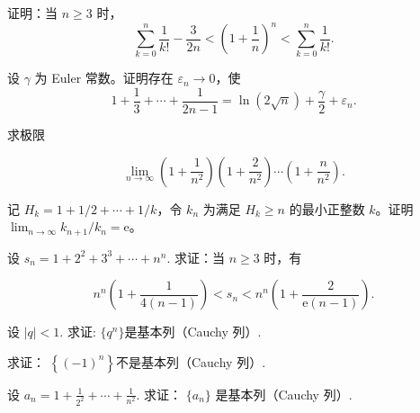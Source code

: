 \newpage
\noindent\begin{minipage}{\textwidth}
证明：当 $n\ge3$ 时，\[\sum_{k=0}^n\frac1{k!}-\frac3{2n}<\left(1+\frac1n\right)^n<\sum_{k=0}^n\frac1{k!}.\]
\end{minipage}\par\vfill
\noindent\begin{minipage}{\textwidth}
设 $\gamma$ 为 Euler 常数。证明存在 $\varepsilon_n\to0$，使\[1+\frac13+\cdots+\frac1{2n-1}=\ln(2\sqrt n)+\frac\gamma2+\varepsilon_n.\]
\end{minipage}\par\vfill
\noindent\begin{minipage}{\textwidth}
求极限

\[\lim_{n\to\infty}\left(1+\frac{1}{n^{2}}\right)\left(1+\frac{2}{n^{2}}\right)\cdots\left(1+\frac{n}{n^{2}}\right).\]
\end{minipage}\par\vfill
\newpage
\noindent\begin{minipage}{\textwidth}
记 $H_k=1+1/2+\cdots+1/k$，令 $k_n$ 为满足 $H_k\ge n$ 的最小正整数 $k$。证明 $\lim_{n\to\infty}k_{n+1}/k_n=\mathrm e$。
\end{minipage}\par\vfill
\noindent\begin{minipage}{\textwidth}
设  $ s_{n}=1+2^{2}+3^{3}+\cdots+n^{n} $. 求证：当  $ n\geqslant3 $ 时，有

\[n^{n}\left(1+\frac{1}{4(n-1)}\right)<s_{n}<n^{n}\left(1+\frac{2}{\mathrm{e}(n-1)}\right).\]
\end{minipage}\par\vfill
\noindent\begin{minipage}{\textwidth}
设 $ |q|<1 $. 求证: $ \{q^n\} $是基本列（Cauchy 列）.
\end{minipage}\par\vfill
\newpage
\noindent\begin{minipage}{\textwidth}
求证： $ \left\{(-1)^{n}\right\} $不是基本列（Cauchy 列）.
\end{minipage}\par\vfill
\noindent\begin{minipage}{\textwidth}
设  $ a_{n}=1+\frac{1}{2^{2}}+\cdots+\frac{1}{n^{2}} $. 求证： $ \{a_{n}\} $ 是基本列（Cauchy 列）.
\end{minipage}\par\vfill
